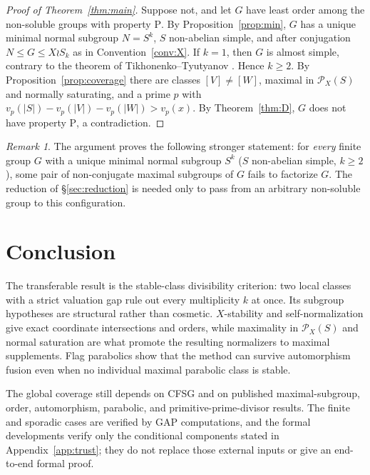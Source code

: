 \documentclass[11pt]{amsart}
\theoremstyle{definition}
\theoremstyle{remark}
\newtheorem{remark}[theorem]{Remark}
\newcommand{\Pos}{\mathcal{P}}
\newcommand{\vp}[1]{v_{#1}}
\begin{document}
\begin{proof}[Proof of Theorem~\ref{thm:main}]
Suppose not, and let $G$ have least order among the non-soluble groups
with property $\mathrm{P}$. By Proposition~\ref{prop:min}, $G$ has a
unique minimal normal subgroup $N=S^k$, $S$ non-abelian simple, and
after conjugation $N\leq G\leq X\wr S_k$ as in Convention~\ref{conv:X}.
If $k=1$, then $G$ is almost simple, contrary to the theorem of
Tikhonenko--Tyutyanov \cite{TT2010}. Hence $k\geq2$. By
Proposition~\ref{prop:coverage} there are classes
$[V]\neq[W]$, maximal in $\Pos_X(S)$ and normally saturating, and a
prime $p$ with $\vp{p}(|S|)-\vp{p}(|V|)-\vp{p}(|W|)>\vp{p}(x)$. By
Theorem~\ref{thm:D}, $G$ does not have property $\mathrm{P}$, a
contradiction.
\end{proof}

\begin{remark}
The argument proves the following stronger statement: for \emph{every}
finite group $G$ with a unique minimal
normal subgroup $S^k$ ($S$ non-abelian simple, $k\geq2$), some pair of
non-conjugate maximal subgroups of $G$ fails to factorize $G$. The
reduction of \S\ref{sec:reduction} is needed only to pass from an
arbitrary non-soluble group to this configuration.
\end{remark}

\section{Conclusion}\label{sec:conclusion}

The transferable result is the stable-class divisibility criterion: two
local classes with a strict valuation gap rule out every multiplicity $k$ at
once. Its subgroup hypotheses are structural rather than cosmetic.
$X$-stability and self-normalization give exact coordinate intersections and
orders, while maximality in $\Pos_X(S)$ and normal saturation are what promote
the resulting normalizers to maximal supplements. Flag parabolics show that
the method can survive automorphism fusion even when no individual maximal
parabolic class is stable.

The global coverage still depends on CFSG and on published maximal-subgroup,
order, automorphism, parabolic, and primitive-prime-divisor results. The finite
and sporadic cases are verified by GAP computations, and the formal developments
verify only the conditional components stated in Appendix~\ref{app:trust};
they do not replace those external inputs or give an end-to-end formal proof.
\end{document}
